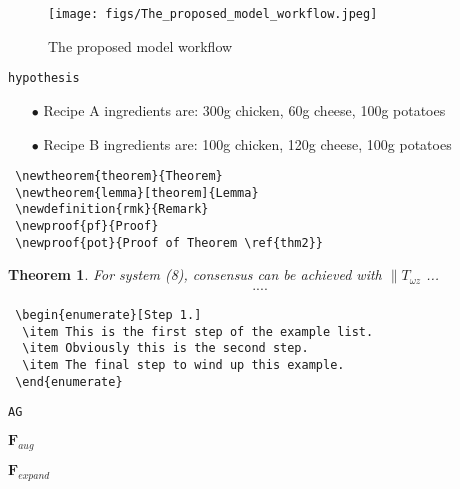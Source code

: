\begin{figure}
	\centering
		\texttt{[image: figs/The\_proposed\_model\_workflow.jpeg]}
	\caption{The proposed model workflow}
	\label{model_workflow}
\end{figure}


{\verb|hypothesis|}


\begin{enumerate}
\item[$\bullet$] Recipe A ingredients are: 300g chicken, 60g cheese, 100g potatoes
\item[$\bullet$] Recipe B ingredients are: 100g chicken, 120g cheese, 100g potatoes
\end{enumerate}


\begin{verbatim}
 \newtheorem{theorem}{Theorem}
 \newtheorem{lemma}[theorem]{Lemma}
 \newdefinition{rmk}{Remark}
 \newproof{pf}{Proof}
 \newproof{pot}{Proof of Theorem \ref{thm2}}
\end{verbatim}


\newtheorem{theorem}{Theorem}

\begin{theorem}
For system (8), consensus can be achieved with 
$\|T_{\omega z}$ ...
\begin{eqnarray}\label{10}
....
\end{eqnarray}
\end{theorem}


\begin{verbatim}
 \begin{enumerate}[Step 1.]
  \item This is the first step of the example list.
  \item Obviously this is the second step.
  \item The final step to wind up this example.
 \end{enumerate}
\end{verbatim}





{\verb|AG|}


$\mathbf{F}_{aug}$

$\mathbf{F}_{expand}$









